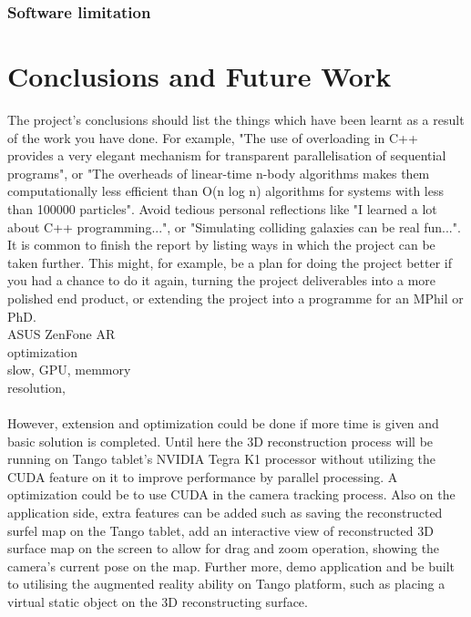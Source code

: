 \documentclass[12pt,twoside]{article}
\begin{document}
\subsubsection{Software limitation}


\newpage

\section{Conclusions and Future Work}
The project's conclusions should list the things which have been learnt as a result of the work you have done. For example, "The use of overloading in C++ provides a very elegant mechanism for transparent parallelisation of sequential programs", or "The overheads of linear-time n-body algorithms makes them computationally less efficient than O(n log n) algorithms for systems with less than 100000 particles". Avoid tedious personal reflections like "I learned a lot about C++ programming...", or "Simulating colliding galaxies can be real fun...". It is common to finish the report by listing ways in which the project can be taken further. This might, for example, be a plan for doing the project better if you had a chance to do it again, turning the project deliverables into a more polished end product, or extending the project into a programme for an MPhil or PhD.\\

ASUS ZenFone AR\\

optimization \\
slow, GPU, memmory\\
resolution, \\
\\
However, extension and optimization could be done if more time is given and basic solution is completed. Until here the 3D reconstruction process will be running on Tango tablet's NVIDIA Tegra K1 processor without utilizing the CUDA feature on it to improve performance by parallel processing. A optimization could be to use CUDA in the camera tracking process. Also on the application side, extra features can be added such as saving the reconstructed surfel map on the Tango tablet, add an interactive view of reconstructed 3D surface map on the screen to allow for drag and zoom operation, showing the camera's current pose on the map. Further more, demo application and be built to utilising the augmented reality ability on Tango platform, such as placing a virtual static object on the 3D reconstructing surface.\\
\end{document}
